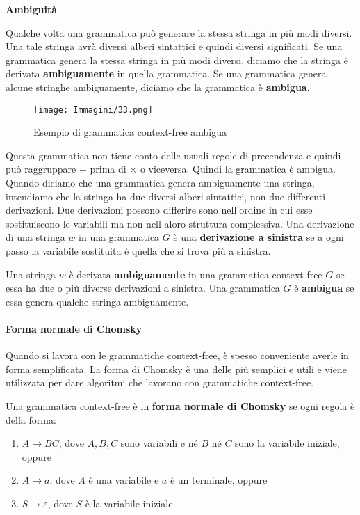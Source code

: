 \documentclass{article}
\begin{document}
\textbf{Ambiguità}

Qualche volta una grammatica può generare la stessa stringa in più modi diversi. Una tale stringa avrà diversi alberi sintattici e quindi diversi significati.
Se una grammatica genera la stessa stringa in più modi diversi, diciamo che la stringa è derivata \textbf{ambiguamente} in quella grammatica. Se una grammatica genera alcune stringhe ambiguamente, diciamo che la grammatica è \textbf{ambigua}.

\begin{figure}[H]
    \centering
    \texttt{[image: Immagini/33.png]}
    \caption{Esempio di grammatica context-free ambigua}
    \label{fig:ambiguous_grammar_example1}
\end{figure}
Questa grammatica non tiene conto delle usuali regole di precendenza e quindi può raggruppare $+$ prima di $\times$ o viceversa. Quindi la grammatica è ambigua.
Quando diciamo che una grammatica genera ambiguamente una stringa, intendiamo che la stringa ha due diversi alberi sintattici, non due differenti derivazioni.
Due derivazioni possono differire sono nell'ordine in cui esse sostituiscono le variabili ma non nell aloro struttura complessiva.
Una derivazione di una stringa $w$ in una grammatica $G$ è una \textbf{derivazione a sinistra} se a ogni passo la variabile sostituita è quella che si trova più a sinistra.
\vspace{1em}

\begin{tcolorbox}[colback=blue!10!white, colframe=blue!50!black, title=Definizione 2.7]
    Una stringa $w$ è derivata \textbf{ambiguamente} in una grammatica context-free $G$ se essa ha due o più diverse derivazioni a sinistra. Una grammatica $G$ è \textbf{ambigua} se essa genera qualche stringa ambiguamente.
\end{tcolorbox}

\paragraph{Forma normale di Chomsky}
\label{Forma normale di Chomsky}
\text{ }

Quando si lavora con le grammatiche context-free, è spesso conveniente averle in forma semplificata. La forma di Chomsky è una delle più semplici e utili e viene utilizzata per dare algoritmi che lavorano con grammatiche context-free.

\begin{tcolorbox}[colback=blue!10!white, colframe=blue!50!black, title=Forma Normale di Chomsky]
    Una grammatica context-free è in \textbf{forma normale di Chomsky} se ogni regola è della forma:
    \begin{enumerate}
        \item $A \rightarrow BC$, dove $A, B, C$ sono variabili e né $B$ né $C$ sono la variabile iniziale, oppure
        \item $A \rightarrow a$, dove $A$ è una variabile e $a$ è un terminale, oppure
        \item $S \rightarrow \varepsilon$, dove $S$ è la variabile iniziale.
    \end{enumerate}
\end{tcolorbox}
\end{document}
